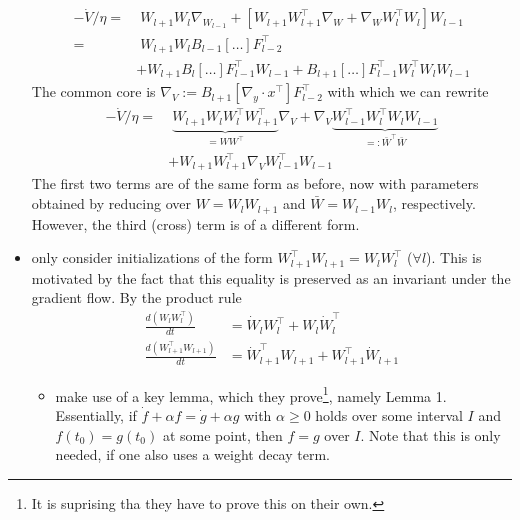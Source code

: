 \documentclass{article}
\begin{document}
\begin{itemize}
\begin{align}
- \dot V/\eta
= &  \; W_{l+1} W_l \nabla_{W_{l-1}} + [W_{l+1} W_{l+1}^\top \nabla_W + \nabla_W W_l^\top W_l] W_{l-1}\\
= &  \; W_{l+1} W_l B_{l-1} [\dots] F_{l-2}^\top \\
& + W_{l+1} B_{l} [\dots] F_{l-1}^\top W_{l-1} + B_{l+1}  [\dots] F_{l-1}^\top W_l^\top W_l W_{l-1}
\end{align} 
The common core is $\nabla_V := B_{l+1} [\nabla _y \cdot x^\top] F_{l-2}^\top$ with which we can rewrite
\begin{align}
- \dot V/\eta = & \; \underbrace{W_{l+1} W_{l} W_l^\top W_{l+1}^\top}_{=W W^\top} \nabla_V   
+ \nabla_V  \underbrace{W_{l-1}^\top W_l^\top W_l W_{l-1}}_{=: \bar W^\top \bar W}\\
& + W_{l+1} W_{l+1}^\top \nabla_V  W_{l-1}^\top W_{l-1}  \nonumber 
\end{align} 
The first two terms are of the same form as before, now with parameters obtained by reducing over $W = W_{l} W_{l+1}$ and $\bar W = W_{l-1} W_l$, respectively. However, the third (cross) term is of a different form. 
\item \cite{arora2018optimization} only consider initializations of the form $W_{l+1}^\top W_{l+1} =  W_l W_l^\top$ ($\forall l$). This is motivated by the fact that this equality is  preserved as an invariant under the gradient flow. By the product rule 
\begin{align}
\frac{d(W_l W_l^\top)}{dt} & = \dot W_l W_l^\top + W_l \dot W_l^\top\\
\frac{d(W_{l+1}^\top W_{l+1})}{dt} & =\dot W^\top_{l+1} W_{l+1} + W_{l+1}^\top \dot W_{l+1} 
\end{align}
\begin{itemize}
\item \cite{arora2018optimization} make use of a key lemma, which they prove\footnote{It is suprising tha they have to prove this on their own.}, namely Lemma 1. Essentially, if $\dot f +  \alpha f = \dot g + \alpha g$ with $\alpha \ge 0$ holds over some interval $I$ and $f(t_0) = g(t_0)$ at some point, then $f=g$ over $I$. Note that this is only needed, if one also uses a weight decay term. 
\end{itemize}
\newpage


\end{itemize}
\end{document}
